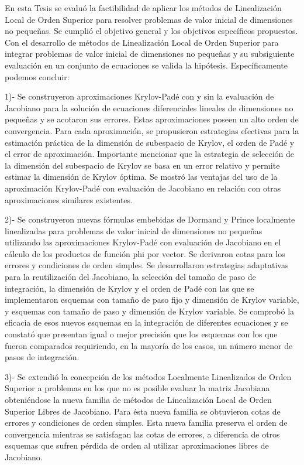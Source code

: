 \begin{conclusions}
	
	En esta Tesis se evaluó la factibilidad de aplicar los métodos de Linealización Local de Orden Superior para resolver problemas de valor inicial de dimensiones no pequeñas. Se cumplió el objetivo general y los objetivos específicos propuestos. Con el desarrollo de métodos de Linealización Local de Orden Superior para integrar problemas de valor inicial de dimensiones no pequeñas y su subsiguiente evaluación en un conjunto de ecuaciones se valida la hipótesis. Específicamente podemos concluir:


    1)- Se construyeron aproximaciones Krylov-Padé con y sin la evaluación de Jacobiano para la solución de ecuaciones diferenciales lineales de dimensiones no pequeñas y se acotaron sus errores. Estas aproximaciones poseen un alto orden de convergencia. Para cada aproximación, se propusieron estrategias efectivas para la estimación práctica de la dimensión de subespacio de Krylov, el orden de Padé y el error de aproximación. Importante mencionar que la estrategia de selección de la dimensión del subespacio de Krylov se basa en un error relativo y permite estimar la dimensión de Krylov óptima. Se mostró las ventajas del uso de la aproximación Krylov-Padé con evaluación de Jacobiano en relación con otras aproximaciones similares existentes.


    2)- Se construyeron nuevas fórmulas embebidas de Dormand y Prince localmente linealizadas para problemas de valor inicial de dimensiones no pequeñas utilizando las aproximaciones Krylov-Padé con evaluación de Jacobiano en el cálculo de los productos de función phi por vector. Se derivaron cotas para los errores y condiciones de orden simples. Se  desarrollaron estrategias adaptativas para la reutilización del Jacobiano, la selección del tamaño de paso de integración, la dimensión de Krylov y el orden de Padé con las que se implementaron esquemas con tamaño de paso fijo y dimensión de Krylov variable, y esquemas con tamaño de paso y dimensión de Krylov variable. Se comprobó la eficacia de esos nuevos esquemas en la integración de diferentes ecuaciones y se constató que presentan igual o mejor precisión que los esquemas con los que fueron comparados requiriendo, en la mayoría de los casos, un número menor de pasos de integración.


    3)- Se extendió la concepción de los métodos Localmente Linealizados de Orden Superior a problemas en los que no es posible evaluar la matriz Jacobiana obteniéndose la nueva familia de métodos de  Linealización Local de Orden Superior Libres de Jacobiano. Para ésta nueva familia se obtuvieron cotas de errores y condiciones de orden simples. Esta nueva familia preserva el orden de convergencia mientras se satisfagan las cotas de errores, a diferencia de otros esquemas que sufren pérdida de orden al utilizar aproximaciones libres de Jacobiano.
    

\end{conclusions}
